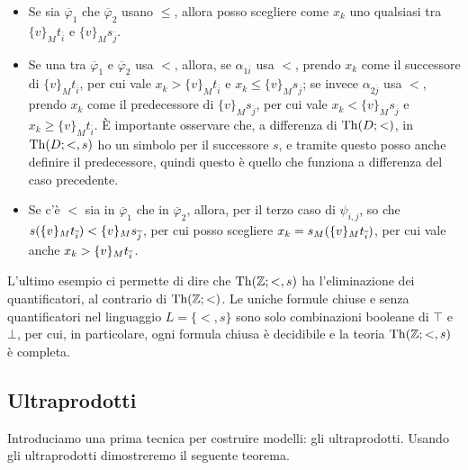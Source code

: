 \begin{soln}
\begin{itemize}
\begin{itemize}
                  \begin{itemize}[$*$]
                    \item Se sia $\overline \varphi_1$ che $\overline \varphi_2$ usano $\leq$, allora posso scegliere come $x_k$ uno qualsiasi tra $\{v\}_M t_{\overline i}$ e $\{v\}_M s_{\overline j}$.
                    \item Se una tra $\overline \varphi_1$ e $\overline \varphi_2$ usa $<$, allora, se $\alpha_{1\overline i}$ usa $<$, prendo $x_k$ come il successore di $\{v\}_M t_{\overline i}$, per cui vale $x_k > \{v\}_M t_{\overline i}$ e $x_k \leq \{v\}_M s_{\overline j}$; se invece $\alpha_{2\overline j}$ usa $<$, prendo $x_k$ come il predecessore di $\{v\}_M s_{\overline j}$, per cui vale $x_k < \{v\}_M s_{\overline j}$ e $x_k \geq \{v\}_M t_{\overline i}$.
                    È importante osservare che, a differenza di $\operatorname{Th}(D;<)$, in $\operatorname{Th}(D;<,s)$ ho un simbolo per il successore $s$, e tramite questo posso anche definire il predecessore, quindi questo è quello che funziona a differenza del caso precedente.
                    \item Se c'è $<$ sia in $\overline \varphi_1$ che in $\overline \varphi_2$, allora, per il terzo caso di $\psi_{i,j}$, so che $s(\{v\}_M t_{\overline i}) < \{v\}_M s_{\overline j}$, per cui posso scegliere $x_k = s_M(\{v\}_M t_{\overline i})$, per cui vale anche $x_k > \{v\}_M t_{\overline i}$.
                  \end{itemize} 
        \end{itemize}
    \end{itemize}
\end{soln}

\begin{example}[Completezza di $\Th(\ZZ;<,s)$]
    L'ultimo esempio ci permette di dire che $\Th(\ZZ;<,s)$ ha l'eliminazione dei quantificatori, al contrario di $\operatorname{Th}(\mathbb Z;<)$.
    Le uniche formule chiuse e senza quantificatori nel linguaggio $L = \{<,s\}$ sono solo combinazioni booleane di $\top$ e $\bot$, per cui, in particolare, ogni formula chiusa è decidibile
    e la teoria $\Th(\ZZ;<,s)$ è completa.
\end{example}

\subsection{Ultraprodotti}
Introduciamo una prima tecnica per costruire modelli: gli ultraprodotti. Usando gli ultraprodotti dimostreremo il seguente teorema.

